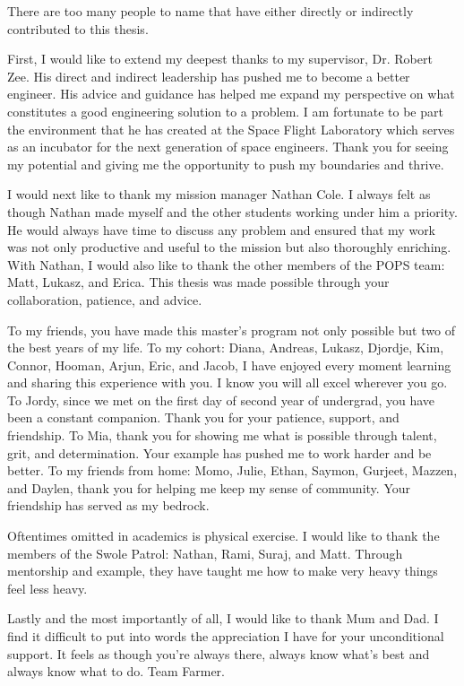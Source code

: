 There are too many people to name that have either directly or indirectly
contributed to this thesis. 

First, I would like to extend my deepest thanks to my supervisor, Dr. Robert
Zee. His direct and indirect leadership has pushed me to become a better
engineer. His advice and guidance has helped me expand my perspective on what
constitutes a good engineering solution to a problem. I am fortunate to be part
the environment that he has created at the Space Flight Laboratory which serves
as an incubator for the next generation of space engineers.  Thank you for
seeing my potential and giving me the opportunity to push my boundaries and
thrive.

I would next like to thank my mission manager Nathan Cole. I always felt as
though Nathan made myself and the other students working under him a priority.
He would always have time to discuss any problem and ensured that my work was
not only productive and useful to the mission but also thoroughly enriching.
With Nathan, I would also like to thank the other members of the POPS team:
Matt, Lukasz, and Erica. This thesis was made possible through your
collaboration, patience, and advice.  

To my friends, you have made this master's program not only possible but two of
the best years of my life. To my cohort: Diana, Andreas, Lukasz, Djordje, Kim,
Connor, Hooman, Arjun, Eric, and Jacob, I have enjoyed every moment learning
and sharing this experience with you. I know you will all excel wherever you
go. To Jordy, since we met on the first day of second year of undergrad, you
have been a constant companion. Thank you for your patience, support, and
friendship. To Mia, thank you for showing me what is possible through talent,
grit, and determination. Your example has pushed me to work harder and be
better.  To my friends from home: Momo, Julie, Ethan, Saymon, Gurjeet, Mazzen,
and Daylen, thank you for helping me keep my sense of community. Your
friendship has served as my bedrock. 

Oftentimes omitted in academics is physical exercise. I would like to thank the
members of the Swole Patrol: Nathan, Rami, Suraj, and Matt. Through mentorship
and example, they have taught me how to make very heavy things feel less heavy.

Lastly and the most importantly of all, I would like to thank Mum and Dad. I
find it difficult to put into words the appreciation I have for your
unconditional support. It feels as though you're always there, always know
what's best and always know what to do. Team Farmer.


